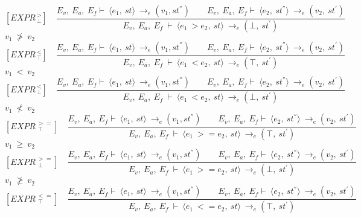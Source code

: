 	\[	
	[EXPR^{\ >}_{\ \bot}] \quad	
	\dfrac{E_v, \ E_a, \ E_f \vdash \ \langle e_1, \ st \rangle \ \rightarrow_e (v_1, st^{''}) \qquad E_v, \ E_a, \ E_f \vdash \ \langle e_2, \ st^{''} \rangle \ \rightarrow_e (v_2, \ st^{'})}{E_v, \ E_a, \ E_f \ \vdash \ \langle e_1 \ > e_2, \ st \rangle \ \rightarrow_e (\bot, \ st^{'})}
	\]
	\begin{math}		
		v_1 \ \not> \ v_2		
	\end{math} 
	\[	
	[EXPR^{\ <}_{\ \top}] \quad	
	\dfrac{E_v, \ E_a, \ E_f \vdash \ \langle e_1, \ st \rangle \ \rightarrow_e (v_1, st^{''}) \qquad E_v, \ E_a, \ E_f \vdash \ \langle e_2, \ st^{''} \rangle \ \rightarrow_e (v_2, \ st^{'})}{E_v, \ E_a, \ E_f \ \vdash \ \langle e_1 \ < e_2, \ st \rangle \ \rightarrow_e (\top, \ st^{'})}
	\]
	\begin{math}		
		v_1 \ < \ v_2		
	\end{math} 
	\[	
	[EXPR^{\ <}_{\ \bot}] \quad	
	\dfrac{E_v, \ E_a, \ E_f \vdash \ \langle e_1, \ st \rangle \ \rightarrow_e (v_1, st^{''}) \qquad E_v, \ E_a, \ E_f \vdash \ \langle e_2, \ st^{''} \rangle \ \rightarrow_e (v_2, \ st^{'})}{E_v, \ E_a, \ E_f \ \vdash \ \langle e_1 \ < e_2, \ st \rangle \ \rightarrow_e (\bot, \ st^{'})}	
	\]
	\begin{math}		
		v_1 \ \not< \ v_2		
	\end{math}
	\[	
	[EXPR^{\ >=}_{\ \ \top}] \quad	
	\dfrac{E_v, \ E_a, \ E_f \vdash \ \langle e_1, \ st \rangle \ \rightarrow_e (v_1, st^{''}) \qquad E_v, \ E_a, \ E_f \vdash \ \langle e_2, \ st^{''} \rangle \ \rightarrow_e (v_2, \ st^{'})}{E_v, \ E_a, \ E_f \ \vdash \ \langle e_1 \ >= e_2, \ st \rangle \ \rightarrow_e (\top, \ st^{'})}	
	\]
	\begin{math}		
		v_1 \ \ge \ v_2		
	\end{math} 
	\[	
	[EXPR^{\ >=}_{\ \ \bot}] \quad	
	\dfrac{E_v, \ E_a, \ E_f \vdash \ \langle e_1, \ st \rangle \ \rightarrow_e (v_1, st^{''}) \qquad E_v, \ E_a, \ E_f \vdash \ \langle e_2, \ st^{''} \rangle \ \rightarrow_e (v_2, \ st^{'})}{E_v, \ E_a, \ E_f \ \vdash \ \langle e_1 \ >= e_2, \ st \rangle \ \rightarrow_e (\bot, \ st^{'})}	
	\]
	\begin{math}		
		v_1 \ \ngeq \ v_2		
	\end{math}
	\[
	[EXPR^{\ <=}_{\ \ \top}] \quad
	\dfrac{E_v, \ E_a, \ E_f \vdash \ \langle e_1, \ st \rangle \ \rightarrow_e (v_1, st^{''}) \qquad E_v, \ E_a, \ E_f \vdash \ \langle e_2, \ st^{''} \rangle \ \rightarrow_e (v_2, \ st^{'})}{E_v, \ E_a, \ E_f \ \vdash \ \langle e_1 \ <= e_2, \ st \rangle \ \rightarrow_e (\top, \ st^{'})}
	\]
